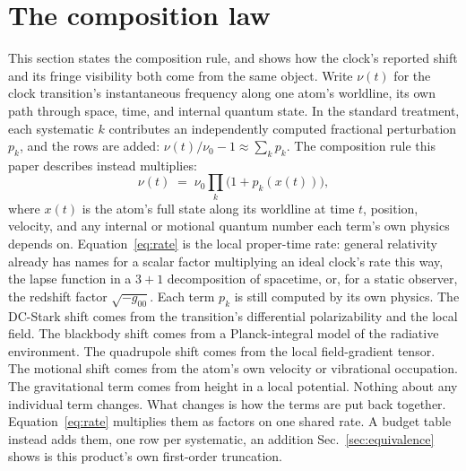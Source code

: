 \documentclass[aps,pra,superscriptaddress,groupedaddress,nofootinbib]{revtex4-2}
\begin{document}
\section{The composition law}
\label{sec:law}

This section states the composition rule, and shows how the
clock's reported shift and its fringe visibility both come from the
same object. Write $\nu(t)$ for the clock transition's instantaneous frequency
along one atom's worldline, its own path through space, time, and
internal quantum state. In the standard treatment, each systematic
$k$ contributes an independently computed fractional perturbation
$p_k$, and the rows are added: $\nu(t)/\nu_0 - 1 \approx \sum_k p_k$.
The composition rule this paper describes instead multiplies:
\begin{equation}
  \nu(t) \;=\; \nu_0 \prod_k \bigl(1 + p_k(x(t))\bigr) ,
  \label{eq:rate}
\end{equation}
where $x(t)$ is the atom's full state along its worldline at time
$t$, position, velocity, and any internal or motional quantum number
each term's own physics depends on. Equation~\eqref{eq:rate} is the
local proper-time rate: general relativity already has names for a
scalar factor multiplying an ideal clock's rate this way, the lapse
function in a $3{+}1$ decomposition of spacetime, or, for a static
observer, the redshift factor $\sqrt{-g_{00}}$. Each term $p_k$ is
still computed by its own physics. The DC-Stark shift comes from the
transition's differential polarizability and the local field. The
blackbody shift comes from a Planck-integral model of the radiative
environment. The quadrupole shift comes from the local field-gradient
tensor. The motional shift comes from the atom's own velocity or
vibrational occupation. The gravitational term comes from height in a
local potential.
Nothing about any individual term changes. What changes is how the
terms are put back together. Equation~\eqref{eq:rate} multiplies them
as factors on one shared rate. A budget table instead adds them, one
row per systematic, an addition Sec.~\ref{sec:equivalence} shows is
this product's own first-order truncation.
\end{document}
